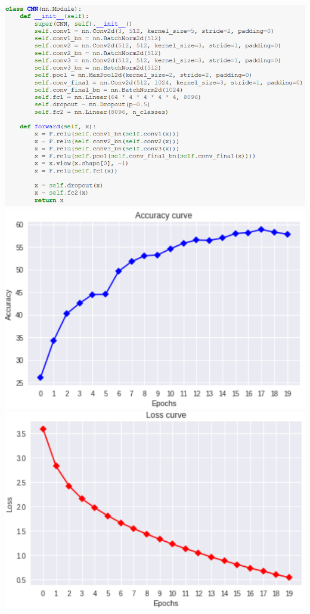 \documentclass[11pt]{article}
\makeatletter
\def\maxwidth{\ifdim\Gin@nat@width>\linewidth\linewidth
  \else\Gin@nat@width\fi}
\let\Oldincludegraphics\includegraphics
\renewcommand{\includegraphics}[1]{\Oldincludegraphics[width=.8\maxwidth]{#1}}
\makeatother
\begin{document}
\begin{center}
  \includegraphics{best_cnn_class.png}
  \includegraphics{best_cnn_acc.png}
  \includegraphics{best_cnn_loss.png}
\end{center}
\newpage
\end{document}

